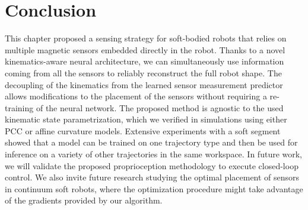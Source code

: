 \section{Conclusion}\label{sec:promasens:conclusion}

This chapter proposed a sensing strategy for soft-bodied robots that relies on multiple magnetic sensors embedded directly in the robot. Thanks to a novel kinematics-aware neural architecture, we can simultaneously use information coming from all the sensors to reliably reconstruct the full robot shape. 
The decoupling of the kinematics from the learned sensor measurement predictor allows modifications to the placement of the sensors without requiring a re-training of the neural network.
The proposed method is agnostic to the used kinematic state parametrization, which we verified in simulations using either \gls{PCC} or affine curvature models.
Extensive experiments with a soft segment showed that a model can be trained on one trajectory type and then be used for inference on a variety of other trajectories in the same workspace.
In future work, we will validate the proposed proprioception methodology to execute closed-loop control. %
We also invite future research studying the optimal placement of sensors in continuum soft robots, where the optimization procedure might take advantage of the gradients provided by our algorithm.
